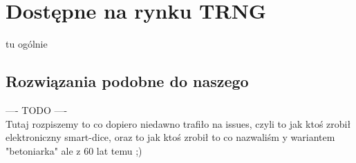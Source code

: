 \section{Dostępne na rynku TRNG}\label{sec:dostepne-na-rynku-trng}


tu ogólnie

\subsection{Rozwiązania podobne do naszego}
    ---- TODO ---- \\

Tutaj rozpiszemy to co dopiero niedawno trafiło na issues, czyli to jak ktoś zrobił elektroniczny smart-dice,
oraz to jak ktoś zrobił to co nazwaliśm y wariantem "betoniarka" ale z 60 lat temu ;)